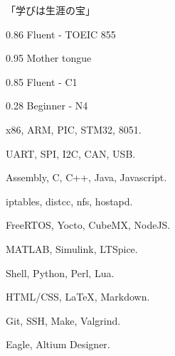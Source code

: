 \documentclass{faresume}
\begin{document}
\begin{column}[\rightcolumnwidth]


		\addcontent
		{
			{\Large\begin{CJK}{UTF8}{min}「学びは生涯の宝」\end{CJK}}
		}{}{}{}{}


		{}{}{}{}

		{}{}{}{}

		{}{}{}{}

		{}{}{}{}

		{}{}{}{}


			{0.86}
			{Fluent - TOEIC 855}
			{}{}{}

			{0.95}
			{Mother tongue}
			{}{}{}

			{0.85}
			{Fluent - C1}
			{}{}{}

			{0.28}
			{Beginner - N4}
			{}{}{}


			{x86, ARM, PIC, STM32, 8051.}
			{}{}{}{}

			{UART, SPI, I2C, CAN, USB.}
			{}{}{}{}

			{Assembly, C, C++, Java, Javascript.}
			{}{}{}{}

            {iptables, distcc, nfs, hostapd.}
            {}{}{}{}

			{FreeRTOS, Yocto, CubeMX, NodeJS.}
			{}{}{}{}

			{MATLAB, Simulink, LTSpice.}
			{}{}{}{}

			{Shell, Python, Perl, Lua.}
			{}{}{}{}

			{HTML/CSS, {\LaTeX}, Markdown.}
			{}{}{}{}

			{Git, SSH, Make, Valgrind.}
			{}{}{}{}

			{Eagle, Altium Designer.}
			{}{}{}{}


\end{column}
\end{document}
